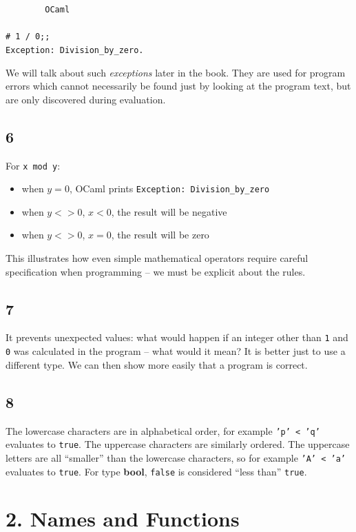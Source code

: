 \documentclass[]{book}
\newcommand{\smspace}{\vspace{4mm}}
\begin{document}
\smspace
\noindent\verb!        OCaml!\\
\noindent\\
\noindent\verb!# 1 / 0;;!\\
\noindent\texttt{Exception:\ Division\_by\_zero.}
\smspace

\noindent We will talk about such \textit{exceptions} later in the book. They are used for program errors which cannot necessarily be found just by looking at the program text, but are only discovered during evaluation.

\subsection*{6}
For \texttt{x mod y}:
  \begin{itemize}
    \item[] when $y = 0$, OCaml prints \texttt{Exception:\ Division\_by\_zero}
    \item[] when $y <> 0$, $x < 0$, the result will be negative
    \item[] when $y <> 0$, $x = 0$, the result will be zero
  \end{itemize}
This illustrates how even simple mathematical operators require careful specification when programming -- we must be explicit about the rules.

\subsection*{7}
It prevents unexpected values: what would happen if an integer other than \texttt{1} and \texttt{0} was calculated in the program -- what would it mean? It is better just to use a different type. We can then show more easily that a program is correct.

\subsection*{8}

The lowercase characters are in alphabetical order, for example \texttt{'p' < 'q'} evaluates to \texttt{true}. The uppercase characters are similarly ordered. The uppercase letters are all ``smaller'' than the lowercase characters, so for example \texttt{'A' < 'a'} evaluates to \texttt{true}. For type \textsf{\textbf{bool}}, \texttt{false} is considered ``less than'' \texttt{true}.

\section*{2. Names and Functions}
\end{document}
